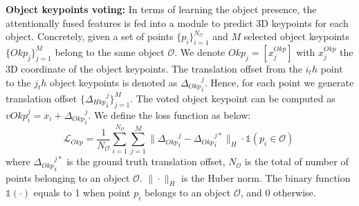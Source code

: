 \textbf{Object keypoints voting:} In terms of learning the object presence, the attentionally fused features is fed into a module to predict 3D keypoints for each object. Concretely, given a set of points $\{ p_i \}^{N_{\mathcal{O}}}_{i=1}$ and $M$ selected object keypoints $\{ Okp_j \}^{M}_{j=1}$ belong to the same object $\mathcal{O}$. We denote $Okp_j = [x^{Okp}_j]$ with $x^{Okp}_j$ the 3D coordinate of the object keypoints. The translation offset from the $i_th$ point to the $j_th$ object keypoints is denoted as ${\Delta_{Okp}}^j_i$. Hence, for each point we generate translation offset $\{ {\Delta_{Hkp}}^j_i \}^{M}_{j=1}$. The voted object keypoint can be computed as $vOkp^j_i = x_i + {\Delta_{Okp}}^j_i$. We define the loss function as below:
\begin{equation}
	\mathcal{L}_{Okp} = \frac{1}{N_{\mathcal{O}}} \sum_{i=1}^{N_{\mathcal{O}}} \sum_{j=1}^{M} \|{\Delta_{Okp}}^j_i - {\Delta_{Okp}}^{j*}_i \|_H \cdot \mathds{1}(p_i \in \mathcal{O}) \
	\label{eq:loss_objectpoints}
\end{equation}
where ${\Delta_{Okp}}^{j*}_i$ is the ground truth translation offset, $N_{\mathcal{O}}$ is the total of number of points belonging to an object $\mathcal{O}$. $\| \cdot \|_H$ is the Huber norm. The binary function $\mathds{1}(\cdot)$ equals to 1 when point $p_i$ belongs to an object $\mathcal{O}$, and 0 otherwise.

